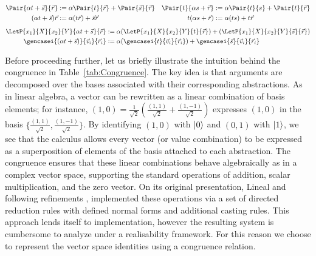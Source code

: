 \begin{table}[t]
  \begin{align*}
    \Pair{\alpha  t+\vec{s}}{\vec{r}} 
    &:= \alpha\Pair{t}{\vec{r}} + \Pair{\vec{s}}{\vec{r}} &
    \Pair{t}{\alpha s+\vec{r}} 
    &:= \alpha\Pair{t}{s} + \Pair{t}{\vec{r}}\\
    (\alpha t+\vec{s})\vec{r} &:= \alpha(t \vec{r})+\vec{s}\vec{r} &
    t(\alpha s+\vec{r}) &:= \alpha (t s)+ t \vec{r}
  \end{align*}
  \vspace{-2\baselineskip}
  \begin{align*}
    \LetP{x_1}{X}{x_2}{Y}{\alpha t+\vec{s}}{\vec{r}}
    &:= \alpha(\LetP{x_1}{X}{x_2}{Y}{t}{\vec{r}})
      +(\LetP{x_1}{X}{x_2}{Y}{\vec{s}}{\vec{r}}) 
      \\
    \gencasei{(\alpha t+\vec{s})}{\vec{v}_{i}}{\vec{r}_{i}}
    &:= \alpha(\gencasei{t}{\vec{v}_i}{\vec{r}_i}) + 
      \gencasei{\vec{s}}{\vec{v}_i}{\vec{r}_i}
  \end{align*}
  \caption{Syntax sugar for term combinations}
  \label{tab:Macros}
\end{table}

Before proceeding further, let us briefly illustrate the intuition behind the
congruence in Table~\ref{tab:Congruence}.  
The key idea is that arguments are decomposed over the bases associated with
their corresponding abstractions.  
As in linear algebra, a vector can be rewritten as a linear combination of
basis elements; for instance,
\(
  (1,0)
  = \tfrac{1}{\sqrt{2}}\!\left(\tfrac{(1,1)}{\sqrt{2}}
  + \tfrac{(1,-1)}{\sqrt{2}}\right)
\)
expresses $(1,0)$ in the basis
$\{\tfrac{(1,1)}{\sqrt{2}}, \tfrac{(1,-1)}{\sqrt{2}}\}$.
By identifying $(1,0)$ with $\left\vert{0}\right\rangle$ and $(0,1)$ with $\left\vert{1}\right\rangle$, we see that
the calculus allows every vector (or value combination) to be expressed as a
superposition of elements of the basis attached to each abstraction.
The congruence ensures that these linear combinations behave algebraically as
in a complex vector space, supporting the standard operations of addition,
scalar multiplication, and the zero vector.
On its original presentation, Lineal \cite{ArrighiDowekLMCS17} and following
refinements \cite{DiazcaroDowekRinaldiBIO19,DiazcaroMonzonAPLAS25}, implemented
these operations via a set of directed reduction rules with defined normal forms
and additional casting rules. This approach lends itself to implementation, however
the resulting system is cumbersome to analyze under a realisability framework.
For this reason we choose to represent the vector space identities using a
congruence relation.


